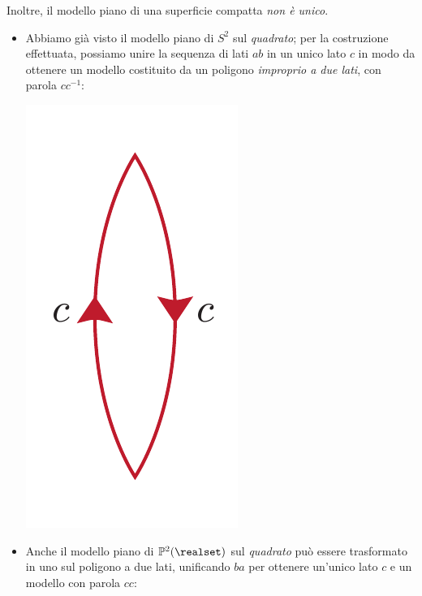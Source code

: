 \begin{observe}
\begin{center}
\end{center}
 Inoltre, il modello piano di una superficie compatta \textit{non è unico}.
\end{observe}

\begin{examples}
	\begin{itemize}
		\item Abbiamo già visto il modello piano di $S^2$ sul \textit{quadrato}; per la costruzione effettuata, possiamo unire la sequenza di lati $ab$ in un unico lato $c$ in modo da ottenere un modello costituito da un poligono \textit{improprio a due lati}, con parola $cc^{-1}$:
		\begin{center}
			\includegraphics[trim=0cm 0cm 0cm 0cm, clip, scale=0.4]{images/sphere2lines.pdf}
		\end{center}
		\item Anche il modello piano di $\mathbb{P}^2(\realset)$ sul \textit{quadrato} può essere trasformato in uno sul poligono a due lati, unificando $ba$ per ottenere un'unico lato $c$ e un modello con parola $cc$:
		\begin{center}

\end{center}
\end{itemize}
\end{examples}
